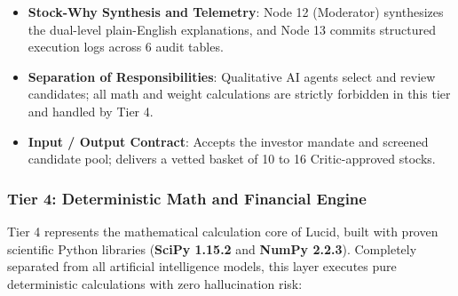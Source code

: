 \begin{itemize}
    \item \textbf{Stock-Why Synthesis and Telemetry}: Node 12 (Moderator) synthesizes the dual-level plain-English explanations, and Node 13 commits structured execution logs across 6 audit tables.
    \item \textbf{Separation of Responsibilities}: Qualitative AI agents select and review candidates; all math and weight calculations are strictly forbidden in this tier and handled by Tier 4.
    \item \textbf{Input / Output Contract}: Accepts the investor mandate and screened candidate pool; delivers a vetted basket of 10 to 16 Critic-approved stocks.
\end{itemize}

\subsubsection{Tier 4: Deterministic Math and Financial Engine}
Tier 4 represents the mathematical calculation core of Lucid, built with proven scientific Python libraries (\textbf{SciPy 1.15.2} and \textbf{NumPy 2.2.3}). Completely separated from all artificial intelligence models, this layer executes pure deterministic calculations with zero hallucination risk:
